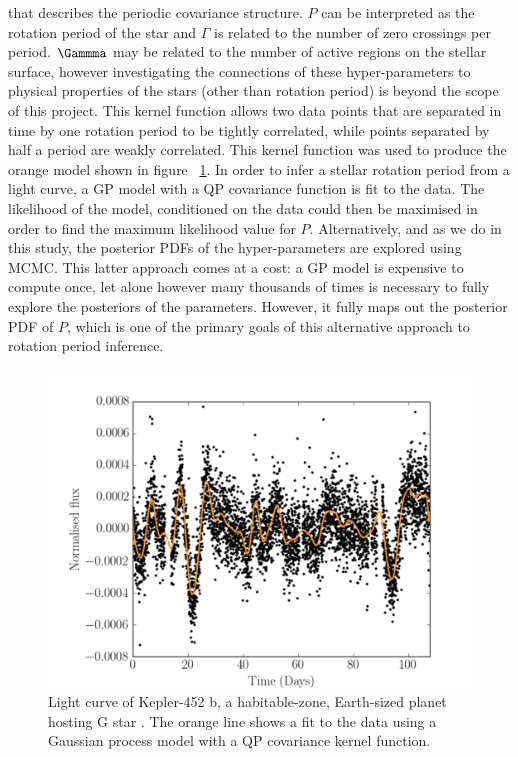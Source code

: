 that describes the periodic covariance structure.
$P$ can be interpreted as the rotation period of the star and $\Gamma$ is
related to the number of zero crossings per period.
$\Gammma$ may be related to the number of active regions on the stellar
surface, however investigating the connections of these hyper-parameters to
physical properties of the stars (other than rotation period) is beyond the
scope of this project.
This kernel function allows two data points that are separated in time by one
rotation period to be tightly correlated, while points separated by half a
period are weakly correlated.
This kernel function was used to produce the orange model shown in figure
~\ref{fig:GP_example}.
In order to infer a stellar rotation period from a light curve, a GP model
with a QP covariance function is fit to the data.
The likelihood of the model, conditioned on the data could then be maximised
in order to find the maximum likelihood value for $P$.
Alternatively, and as we do in this study, the posterior PDFs of the
hyper-parameters are explored using MCMC.
This latter approach comes at a cost: a GP model is expensive to compute
once, let alone however many thousands of times is necessary to fully explore
the posteriors of the parameters.
However, it fully maps out the posterior PDF of $P$, which is one of the
primary goals of this alternative approach to rotation period inference.

\begin{figure}
\begin{center}
\includegraphics[width=6in, clip=true]{figures/Kepler452b.pdf}
\caption{Light curve of Kepler-452 b, a habitable-zone, Earth-sized planet
hosting G star \citep{jenkins}. The orange line shows a fit to the data using
a Gaussian process model with a QP covariance kernel function.}
\label{fig:GP_example}
\end{center}
\end{figure}

